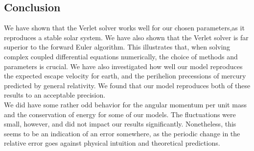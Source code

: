 \documentclass[a4paper, 10pt]{article}
\begin{document}
\subsection{Conclusion}
We have shown that the Verlet solver works well for our chosen parameters,as it reproduces a stable solar system. We have also shown that the Verlet solver is far superior to the forward Euler algorithm. This illustrates that, when solving complex coupled differential equations numerically, the choice of methods and parameters is crucial. We have also investigated how well our model reproduces the expected escape velocity for earth, and the perihelion precessions of mercury predicted by general relativity. We found that our model reproduces both of these results to an acceptable precision.\\
\linebreak
We did have some rather odd behavior for the angular momentum per unit mass and the conservation of energy for some of our models. The fluctuations were small, however, and did not impact our results significantly. Nonetheless, this seems to be an indication of an error somewhere, as the periodic change in the relative error goes against physical intuition and theoretical predictions. 
\end{document}

